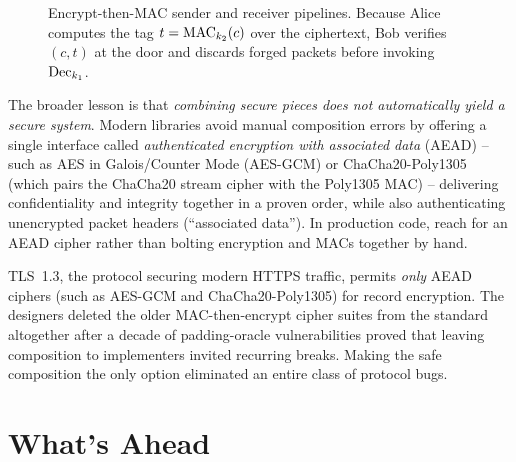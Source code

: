 \begin{figure}[htbp]
\caption{Encrypt-then-MAC sender and receiver pipelines. Because Alice computes the tag $t = \operatorname{MAC}_{k_2}(c)$ over the ciphertext, Bob verifies $(c, t)$ at the door and discards forged packets before invoking $\operatorname{Dec}_{k_1}$.}
\label{ch01:fig-etm}
\end{figure}

The broader lesson is that \emph{combining secure pieces does not automatically yield a secure system}. Modern libraries avoid manual composition errors by offering a single interface called \emph{authenticated encryption with associated data} (AEAD) -- such as AES in Galois/Counter Mode (AES-GCM) or ChaCha20-Poly1305 (which pairs the ChaCha20 stream cipher with the Poly1305 MAC) -- delivering confidentiality and integrity together in a proven order, while also authenticating unencrypted packet headers (``associated data''). In production code, reach for an AEAD cipher rather than bolting encryption and MACs together by hand.

\begin{applicationbox}
TLS~1.3, the protocol securing modern HTTPS traffic, permits \emph{only} AEAD ciphers (such as AES-GCM and ChaCha20-Poly1305) for record encryption. The designers deleted the older MAC-then-encrypt cipher suites from the standard altogether after a decade of padding-oracle vulnerabilities proved that leaving composition to implementers invited recurring breaks. Making the safe composition the only option eliminated an entire class of protocol bugs.
\end{applicationbox}

\section{What's Ahead}
\label{ch01:roadmap}

